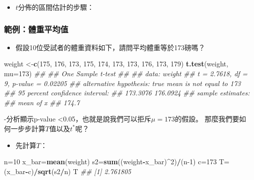 \documentclass[hyperref,]{ctexart}
\newenvironment{Shaded}{\begin{snugshade}}{\end{snugshade}}
\newcommand{\CommentTok}[1]{\textcolor[rgb]{0.56,0.35,0.01}{\textit{#1}}}
\newcommand{\DataTypeTok}[1]{\textcolor[rgb]{0.13,0.29,0.53}{#1}}
\newcommand{\DecValTok}[1]{\textcolor[rgb]{0.00,0.00,0.81}{#1}}
\newcommand{\KeywordTok}[1]{\textcolor[rgb]{0.13,0.29,0.53}{\textbf{#1}}}
\newcommand{\NormalTok}[1]{#1}
\newcommand{\OperatorTok}[1]{\textcolor[rgb]{0.81,0.36,0.00}{\textbf{#1}}}
\providecommand{\tightlist}{%
  \setlength{\itemsep}{0pt}\setlength{\parskip}{0pt}}
\begin{document}
\begin{itemize}
\tightlist
\item
  \(t\)分佈的區間估計的步驟：
\end{itemize}

\hypertarget{ux7bc4ux4f8bux9ad4ux91cdux5e73ux5747ux503c}{%
\subsubsection{範例：體重平均值}\label{ux7bc4ux4f8bux9ad4ux91cdux5e73ux5747ux503c}}

\begin{itemize}
\tightlist
\item
  假設10位受試者的體重資料如下，請問平均體重等於173磅嗎？
\end{itemize}

\begin{Shaded}
\begin{Highlighting}[]
\NormalTok{weight <-}\KeywordTok{c}\NormalTok{(}\DecValTok{175}\NormalTok{, }\DecValTok{176}\NormalTok{, }\DecValTok{173}\NormalTok{, }\DecValTok{175}\NormalTok{, }\DecValTok{174}\NormalTok{, }\DecValTok{173}\NormalTok{, }\DecValTok{173}\NormalTok{, }\DecValTok{176}\NormalTok{, }\DecValTok{173}\NormalTok{, }\DecValTok{179}\NormalTok{)}
\KeywordTok{t.test}\NormalTok{(weight, }\DataTypeTok{mu=}\DecValTok{173}\NormalTok{)}
\CommentTok{## }
\CommentTok{##  One Sample t-test}
\CommentTok{## }
\CommentTok{## data:  weight}
\CommentTok{## t = 2.7618, df = 9, p-value = 0.02205}
\CommentTok{## alternative hypothesis: true mean is not equal to 173}
\CommentTok{## 95 percent confidence interval:}
\CommentTok{##  173.3076 176.0924}
\CommentTok{## sample estimates:}
\CommentTok{## mean of x }
\CommentTok{##     174.7}
\end{Highlighting}
\end{Shaded}

-分析顯示p-value \textless0.05，也就是說我們可以拒斥\(\mu=173\)的假設。
那麼我們要如何一步步計算\(T\)值以及\(t^{*}\)呢？

\begin{itemize}
\tightlist
\item
  先計算\(T\)：
\end{itemize}

\begin{Shaded}
\begin{Highlighting}[]
\NormalTok{n=}\DecValTok{10}
\NormalTok{x_bar=}\KeywordTok{mean}\NormalTok{(weight)}
\NormalTok{s2=}\KeywordTok{sum}\NormalTok{((weight}\OperatorTok{-}\NormalTok{x_bar)}\OperatorTok{^}\DecValTok{2}\NormalTok{)}\OperatorTok{/}\NormalTok{(n}\DecValTok{-1}\NormalTok{)}
\NormalTok{c=}\DecValTok{173}
\NormalTok{T=(x_bar}\OperatorTok{-}\NormalTok{c)}\OperatorTok{/}\KeywordTok{sqrt}\NormalTok{(s2}\OperatorTok{/}\NormalTok{n)}
\NormalTok{T}
\CommentTok{## [1] 2.761805}
\end{Highlighting}
\end{Shaded}
\end{document}
